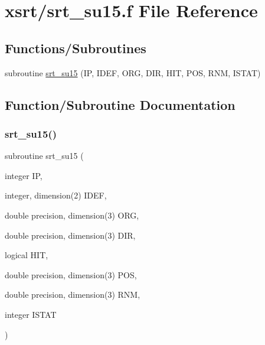 \hypertarget{srt__su15_8f}{}\section{xsrt/srt\+\_\+su15.f File Reference}
\label{srt__su15_8f}
\subsection*{Functions/\+Subroutines}
\begin{DoxyCompactItemize}
\item 
subroutine \hyperlink{srt__su15_8f_aa951ae34773dbea77583f3282f6e3c00}{srt\+\_\+su15} (IP, I\+D\+EF, O\+RG, D\+IR, H\+IT, P\+OS, R\+NM, I\+S\+T\+AT)
\end{DoxyCompactItemize}


\subsection{Function/\+Subroutine Documentation}
\mbox{\label{srt__su15_8f_aa951ae34773dbea77583f3282f6e3c00}} 
\subsubsection{\texorpdfstring{srt\+\_\+su15()}{srt\_su15()}}
{\footnotesize\ttfamily subroutine srt\+\_\+su15 (\begin{DoxyParamCaption}\item[{integer}]{IP,  }\item[{integer, dimension(2)}]{I\+D\+EF,  }\item[{double precision, dimension(3)}]{O\+RG,  }\item[{double precision, dimension(3)}]{D\+IR,  }\item[{logical}]{H\+IT,  }\item[{double precision, dimension(3)}]{P\+OS,  }\item[{double precision, dimension(3)}]{R\+NM,  }\item[{integer}]{I\+S\+T\+AT }\end{DoxyParamCaption})}

